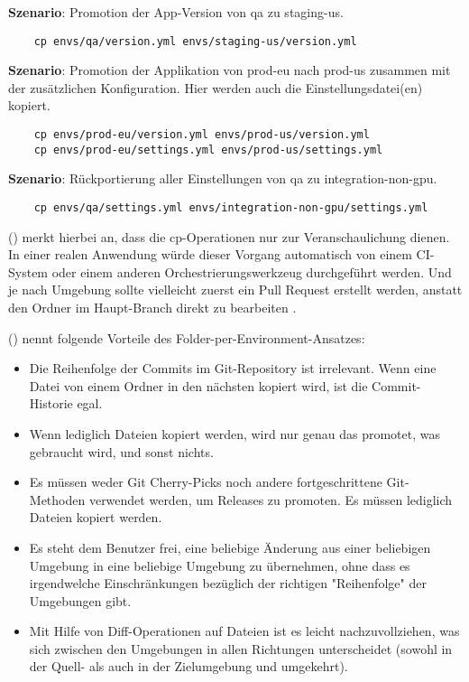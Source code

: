 \textbf{Szenario}: Promotion der App-Version von qa zu staging-us.

\begin{verbatim}
	cp envs/qa/version.yml envs/staging-us/version.yml
\end{verbatim}

\textbf{Szenario}: Promotion der Applikation von prod-eu nach prod-us zusammen mit der zusätzlichen Konfiguration. Hier werden auch die Einstellungsdatei(en) kopiert.

\begin{verbatim}
	cp envs/prod-eu/version.yml envs/prod-us/version.yml
	cp envs/prod-eu/settings.yml envs/prod-us/settings.yml
\end{verbatim}

\textbf{Szenario}: Rückportierung aller Einstellungen von qa zu integration-non-gpu.

\begin{verbatim}
	cp envs/qa/settings.yml envs/integration-non-gpu/settings.yml
\end{verbatim}

\citeauthor{codefreshHowToModelGitOpsEnvironmentsAndPromote} (\citeyear{codefreshHowToModelGitOpsEnvironmentsAndPromote})
merkt hierbei an,
dass die cp-Operationen nur zur Veranschaulichung dienen. 
In einer realen Anwendung würde dieser Vorgang automatisch von einem CI-System 
oder einem anderen Orchestrierungswerkzeug durchgeführt werden. Und je nach Umgebung 
sollte vielleicht zuerst ein Pull Request erstellt werden, anstatt den Ordner im Haupt-Branch direkt zu bearbeiten
\autocite{codefreshHowToModelGitOpsEnvironmentsAndPromote}.
\bigskip

\citeauthor{codefreshHowToModelGitOpsEnvironmentsAndPromote} (\citeyear{codefreshHowToModelGitOpsEnvironmentsAndPromote})
nennt folgende Vorteile des Folder-per-Environment-Ansatzes:

\begin{itemize}
	\item Die Reihenfolge der Commits im Git-Repository ist irrelevant. Wenn eine Datei von einem Ordner in den nächsten kopiert wird, ist die Commit-Historie egal.
	\item Wenn lediglich Dateien kopiert werden, wird nur genau das promotet, was gebraucht wird, und sonst nichts.
	\item Es müssen weder Git Cherry-Picks noch andere fortgeschrittene Git-Methoden verwendet werden, um Releases zu promoten. Es müssen lediglich Dateien kopiert werden.
	\item Es steht dem Benutzer frei, eine beliebige Änderung aus einer beliebigen Umgebung in eine beliebige Umgebung zu übernehmen, ohne dass es irgendwelche Einschränkungen bezüglich der richtigen "Reihenfolge" der Umgebungen gibt.
	\item Mit Hilfe von Diff-Operationen auf Dateien ist es leicht nachzuvollziehen, was sich zwischen den Umgebungen in allen Richtungen unterscheidet (sowohl in der Quell- als auch in der Zielumgebung und umgekehrt).
\end{itemize}










